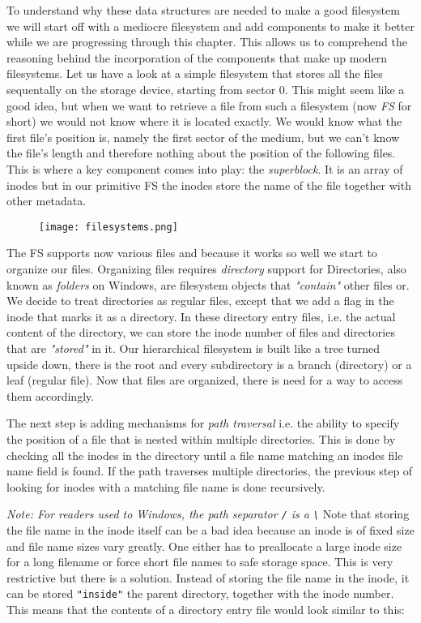 To understand why these data structures are needed to make a good filesystem we will start off with a
mediocre filesystem and add components to make it better while we are progressing through this chapter. 
This allows us to comprehend the reasoning behind the incorporation of the components that make up modern filesystems.
Let us have a look at a simple filesystem that stores all the files sequentally on the storage device,
starting from sector 0. This might seem like a good idea, but when we want to retrieve a file from
such a filesystem (now \textit{FS} for short) we would not know where it is located exactly. We would know
what the first file's position is, namely the first sector of the medium, but we can't know the file's
length and therefore nothing about the position of the following files. This is where a key component
comes into play: the \textit{superblock}. It is an array of inodes but in our primitive FS the inodes store the name of
the file together with other metadata.

\begin{figure}[h]
	\texttt{[image: filesystems.png]}
	\centering
\end{figure}

The FS supports now various files and
because it works so well we start to organize our files. Organizing files requires \textit{directory}
support for Directories, also known as \textit{folders} on Windows, are filesystem objects that
\textit{"contain"} other files or. We decide to treat directories as regular files, except that we
add a flag in the inode that marks it as a directory. In these directory entry files, i.e. the actual
content of the directory, we can store the inode number of files and directories that are \textit{"stored"}
in it. Our hierarchical filesystem is built like a tree turned upside down, there is the root and every
subdirectory is a branch (directory) or a leaf (regular file). Now that files are organized, there is need
for a way to access them accordingly.

The next step is adding mechanisms for \textit{path traversal} i.e. the
ability to specify the position of a file that is nested within multiple directories. This is done by
checking all the inodes in the directory until a file name matching an inodes file name field is
found. If the path traverses multiple directories, the previous step of looking for inodes with a
matching file name is done recursively.


\textit{Note: For readers used to Windows, the path separator \texttt{/} is a \texttt{\textbackslash}}
Note that storing the file name in the inode itself can be a
bad idea because an inode is of fixed size and file name sizes vary greatly. One either has to preallocate a large inode size for a long filename
or force short file names to safe storage space. This is very restrictive but there is a solution.
Instead of storing the file name in the inode, it can be stored \texttt{"inside"} the parent directory,
together with the inode number. This means that the contents of a directory entry file would look similar 
to this:

